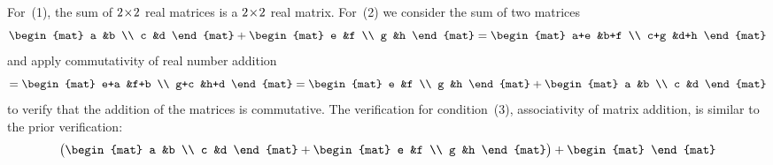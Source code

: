 \begin{exercises}
\begin{answer}
\begin{exparts}
          For~(1), the sum of $2 \! \times \! 2$ real matrices is a $2 \! \times \! 2$
          real matrix.
          For~(2) we consider the sum of two matrices 
          \begin{equation*}
            \begin{mat}
              a  &b  \\
              c  &d
            \end{mat}+
            \begin{mat}
              e  &f  \\
              g  &h
            \end{mat}
            =
            \begin{mat}
              a+e  &b+f  \\
              c+g  &d+h
            \end{mat}
          \end{equation*}
          and apply commutativity of real number addition
          \begin{equation*}
            =\begin{mat}
              e+a  &f+b  \\
              g+c  &h+d
            \end{mat}
            =
            \begin{mat}
              e  &f  \\
              g  &h
            \end{mat}
            +
            \begin{mat}
              a  &b  \\
              c  &d
            \end{mat}
          \end{equation*}
          to verify that the addition of the matrices is commutative.
          The verification for condition~(3), 
          associativity of matrix addition, is similar
          to the prior verification:
          \begin{equation*}
            \big(
              \begin{mat}
                a  &b  \\
                c  &d  
              \end{mat}
              +\begin{mat}
                e  &f  \\
                g  &h  
              \end{mat}
            \big)
            +
            \begin{mat}

\end{mat}
\end{equation*}
\end{exparts}
\end{answer}
\end{exercises}
